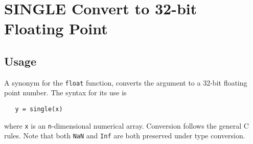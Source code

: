 \section{SINGLE Convert to 32-bit Floating Point}

\subsection{Usage}

A synonym for the \verb|float| function, converts the argument to
a 32-bit floating point number.  The syntax
for its use is
\begin{verbatim}
   y = single(x)
\end{verbatim}
where \verb|x| is an \verb|n|-dimensional numerical array.  Conversion 
follows the general C rules.  Note that both \verb|NaN| and \verb|Inf| 
are both preserved under type conversion.

